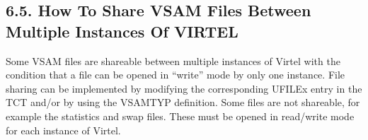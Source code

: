 \documentclass[letterpaper,10pt,english]{sphinxmanual}
\begin{document}
\begin{sphinxVerbatim}[commandchars=\\\{\}]

                             
                                                    
                                                       
                                                       
                                                       
         
                               
                                                    
                                                      
                                                       
                                                      
        
\end{sphinxVerbatim}


\subsection{6.5. How To Share VSAM Files Between Multiple Instances Of VIRTEL}
\label{\detokenize{Installation_Guide:how-to-share-vsam-files-between-multiple-instances-of-virtel}}
Some VSAM files are shareable between multiple instances of Virtel with the condition that a file can be opened in “write” mode by only one instance. File sharing can be implemented by modifying the corresponding UFILEx entry in the TCT and/or by using the VSAMTYP definition. Some files are not shareable, for example the statistics and swap files. These must be opened in read/write mode for each instance of Virtel.
\end{document}

